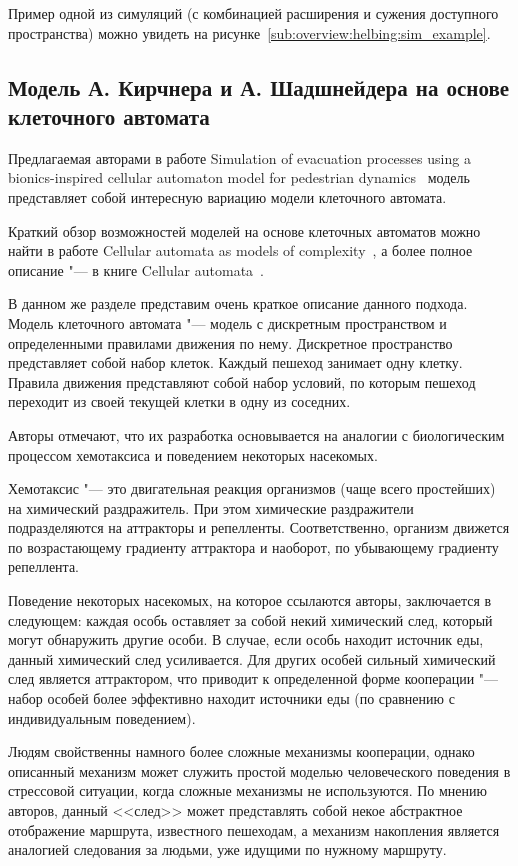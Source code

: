 Пример одной из симуляций (с комбинацией расширения и сужения доступного пространства) можно увидеть на рисунке~\ref{sub:overview:helbing:sim_example}.


\subsection{Модель А. Кирчнера и А. Шадшнейдера на основе клеточного автомата}
\label{sub:overview:kirchner}

Предлагаемая авторами в работе Simulation of evacuation processes using a bionics-inspired cellular automaton model for pedestrian dynamics~\cite{kirchner2002simulation} модель представляет собой интересную вариацию модели клеточного автомата.

Краткий обзор возможностей моделей на основе клеточных автоматов можно найти в работе Cellular automata as models of complexity~\cite{wolfram1984cellular},
а более полное описание "--- в книге Cellular automata~\cite{chopard1998cellular}.

В данном же разделе представим очень краткое описание данного подхода.
Модель клеточного автомата "--- модель с дискретным пространством и определенными правилами движения по нему.
Дискретное пространство представляет собой набор клеток. Каждый пешеход занимает одну клетку.
Правила движения представляют собой набор условий, по которым пешеход переходит из своей текущей клетки в одну из соседних.

Авторы отмечают, что их разработка основывается на аналогии с биологическим процессом хемотаксиса и поведением некоторых насекомых.

Хемотаксис "--- это двигательная реакция организмов (чаще всего простейших) на химический раздражитель.
При этом химические раздражители подразделяются на аттракторы и репелленты.
Соответственно, организм движется по возрастающему градиенту аттрактора и наоборот, по убывающему градиенту репеллента.

Поведение некоторых насекомых, на которое ссылаются авторы, заключается в следующем:
каждая особь оставляет за собой некий химический след, который могут обнаружить другие особи.
В случае, если особь находит источник еды, данный химический след усиливается.
Для других особей сильный химический след является аттрактором, что приводит к определенной форме кооперации "---
набор особей более эффективно находит источники еды (по сравнению с индивидуальным поведением).

Людям свойственны намного более сложные механизмы кооперации, однако описанный механизм может служить простой моделью человеческого поведения в стрессовой ситуации,
когда сложные механизмы не используются. По мнению авторов, данный <<след>> может представлять собой некое абстрактное отображение маршрута, известного пешеходам,
а механизм накопления является аналогией следования за людьми, уже идущими по нужному маршруту.

